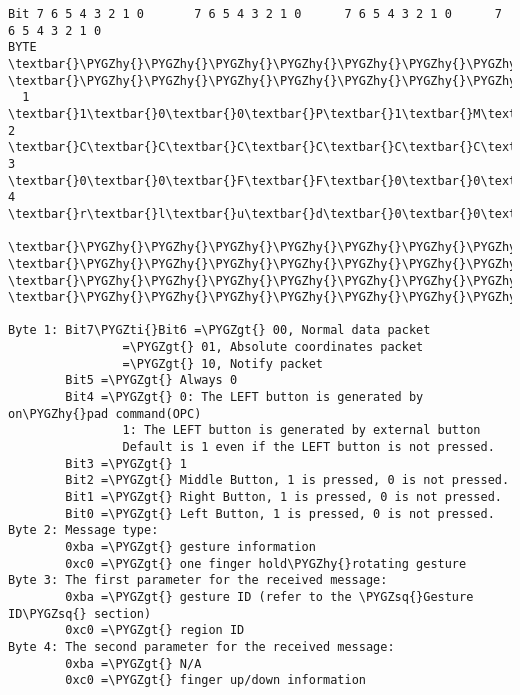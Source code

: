 \documentclass[a4paper,8pt,english]{sphinxmanual}
\def\PYGZgt{\char`\>}
\def\PYGZhy{\char`\-}
\def\PYGZsq{\char`\'}
\def\PYGZti{\char`\~}
\renewcommand\PYGZsq{\textquotesingle}
\begin{document}
\begin{Verbatim}[commandchars=\\\{\}]
Bit 7 6 5 4 3 2 1 0       7 6 5 4 3 2 1 0      7 6 5 4 3 2 1 0      7 6 5 4 3 2 1 0
BYTE  \textbar{}\PYGZhy{}\PYGZhy{}\PYGZhy{}\PYGZhy{}\PYGZhy{}\PYGZhy{}\PYGZhy{}\PYGZhy{}\PYGZhy{}\PYGZhy{}\PYGZhy{}\PYGZhy{}\PYGZhy{}\PYGZhy{}\PYGZhy{}\textbar{}BYTE \textbar{}\PYGZhy{}\PYGZhy{}\PYGZhy{}\PYGZhy{}\PYGZhy{}\PYGZhy{}\PYGZhy{}\PYGZhy{}\PYGZhy{}\PYGZhy{}\PYGZhy{}\PYGZhy{}\PYGZhy{}\PYGZhy{}\PYGZhy{}\textbar{}BYTE\textbar{}\PYGZhy{}\PYGZhy{}\PYGZhy{}\PYGZhy{}\PYGZhy{}\PYGZhy{}\PYGZhy{}\PYGZhy{}\PYGZhy{}\PYGZhy{}\PYGZhy{}\PYGZhy{}\PYGZhy{}\PYGZhy{}\PYGZhy{}\textbar{}BYTE\textbar{}\PYGZhy{}\PYGZhy{}\PYGZhy{}\PYGZhy{}\PYGZhy{}\PYGZhy{}\PYGZhy{}\PYGZhy{}\PYGZhy{}\PYGZhy{}\PYGZhy{}\PYGZhy{}\PYGZhy{}\PYGZhy{}\PYGZhy{}\textbar{}
  1   \textbar{}1\textbar{}0\textbar{}0\textbar{}P\textbar{}1\textbar{}M\textbar{}R\textbar{}L\textbar{}  2  \textbar{}C\textbar{}C\textbar{}C\textbar{}C\textbar{}C\textbar{}C\textbar{}C\textbar{}C\textbar{}  3 \textbar{}0\textbar{}0\textbar{}F\textbar{}F\textbar{}0\textbar{}0\textbar{}0\textbar{}i\textbar{}  4 \textbar{}r\textbar{}l\textbar{}u\textbar{}d\textbar{}0\textbar{}0\textbar{}0\textbar{}0\textbar{}
      \textbar{}\PYGZhy{}\PYGZhy{}\PYGZhy{}\PYGZhy{}\PYGZhy{}\PYGZhy{}\PYGZhy{}\PYGZhy{}\PYGZhy{}\PYGZhy{}\PYGZhy{}\PYGZhy{}\PYGZhy{}\PYGZhy{}\PYGZhy{}\textbar{}     \textbar{}\PYGZhy{}\PYGZhy{}\PYGZhy{}\PYGZhy{}\PYGZhy{}\PYGZhy{}\PYGZhy{}\PYGZhy{}\PYGZhy{}\PYGZhy{}\PYGZhy{}\PYGZhy{}\PYGZhy{}\PYGZhy{}\PYGZhy{}\textbar{}    \textbar{}\PYGZhy{}\PYGZhy{}\PYGZhy{}\PYGZhy{}\PYGZhy{}\PYGZhy{}\PYGZhy{}\PYGZhy{}\PYGZhy{}\PYGZhy{}\PYGZhy{}\PYGZhy{}\PYGZhy{}\PYGZhy{}\PYGZhy{}\textbar{}    \textbar{}\PYGZhy{}\PYGZhy{}\PYGZhy{}\PYGZhy{}\PYGZhy{}\PYGZhy{}\PYGZhy{}\PYGZhy{}\PYGZhy{}\PYGZhy{}\PYGZhy{}\PYGZhy{}\PYGZhy{}\PYGZhy{}\PYGZhy{}\textbar{}

Byte 1: Bit7\PYGZti{}Bit6 =\PYGZgt{} 00, Normal data packet
                =\PYGZgt{} 01, Absolute coordinates packet
                =\PYGZgt{} 10, Notify packet
        Bit5 =\PYGZgt{} Always 0
        Bit4 =\PYGZgt{} 0: The LEFT button is generated by on\PYGZhy{}pad command(OPC)
                1: The LEFT button is generated by external button
                Default is 1 even if the LEFT button is not pressed.
        Bit3 =\PYGZgt{} 1
        Bit2 =\PYGZgt{} Middle Button, 1 is pressed, 0 is not pressed.
        Bit1 =\PYGZgt{} Right Button, 1 is pressed, 0 is not pressed.
        Bit0 =\PYGZgt{} Left Button, 1 is pressed, 0 is not pressed.
Byte 2: Message type:
        0xba =\PYGZgt{} gesture information
        0xc0 =\PYGZgt{} one finger hold\PYGZhy{}rotating gesture
Byte 3: The first parameter for the received message:
        0xba =\PYGZgt{} gesture ID (refer to the \PYGZsq{}Gesture ID\PYGZsq{} section)
        0xc0 =\PYGZgt{} region ID
Byte 4: The second parameter for the received message:
        0xba =\PYGZgt{} N/A
        0xc0 =\PYGZgt{} finger up/down information
\end{Verbatim}
\end{document}
